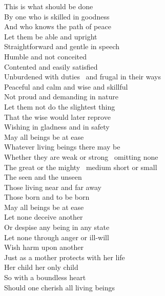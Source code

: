 \begin{english-only}
  This is what should be done\\
  By one who is skilled in goodness\\
  And who knows the path of peace\\
  Let them be able and upright\\
  Straightforward and gentle in speech\\
  Humble and not conceited\\
  Contented and easily satisfied\\
  Unburdened with duties \breathmark\ and frugal in their ways\\
  Peaceful and calm and wise and skillful\\
  Not proud and demanding in nature\\
  Let them not do the slightest thing\\
  That the wise would later reprove\\
  Wishing in gladness and in safety\\
  May all beings be at ease\\
  Whatever living beings there may be\\
  Whether they are weak or strong \breathmark\ omitting none\\
  The great or the mighty \breathmark\ medium short or small\\
  The seen and the unseen\\
  Those living near and far away\\
  Those born and to be born\\
  May all beings be at ease\\
  Let none deceive another\\
  Or despise any being in any state\\
  Let none through anger or ill-will\\
  Wish harm upon another\\
  Just\ifdigitalversion\makeatletter\hyperlink{endnote49-appendix}\makeatother\fi
  as a mother protects with her life\\
  Her child her only child\\
  So with a boundless heart\\
  Should one cherish\makeatletter\hyperlink{endnote161-appendix} all living beings\\

\end{english-only}
